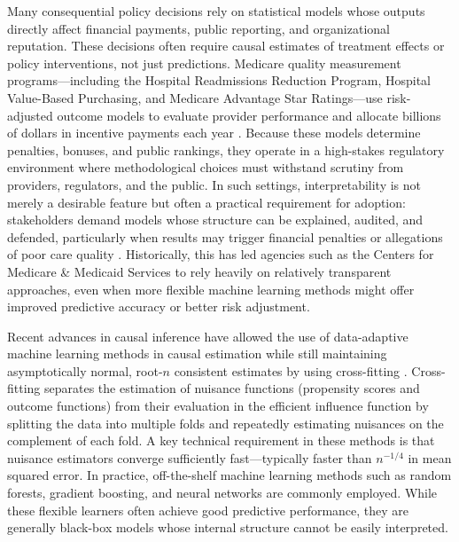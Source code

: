 \documentclass[12pt]{article}
\begin{document}
Many consequential policy decisions rely on statistical models whose outputs directly affect financial payments, public reporting, and organizational reputation. These decisions often require causal estimates of treatment effects or policy interventions, not just predictions. Medicare quality measurement programs---including the Hospital Readmissions Reduction Program, Hospital Value-Based Purchasing, and Medicare Advantage Star Ratings---use risk-adjusted outcome models to evaluate provider performance and allocate billions of dollars in incentive payments each year \citep{cms_quality}. Because these models determine penalties, bonuses, and public rankings, they operate in a high-stakes regulatory environment where methodological choices must withstand scrutiny from providers, regulators, and the public. In such settings, interpretability is not merely a desirable feature but often a practical requirement for adoption: stakeholders demand models whose structure can be explained, audited, and defended, particularly when results may trigger financial penalties or allegations of poor care quality \citep{obermeyer2019, rajkomar2019, rudin2019}. Historically, this has led agencies such as the Centers for Medicare \& Medicaid Services to rely heavily on relatively transparent approaches, even when more flexible machine learning methods might offer improved predictive accuracy or better risk adjustment.

Recent advances in causal inference have allowed the use of data-adaptive machine learning methods in causal estimation while still maintaining asymptotically normal, root-$n$ consistent estimates by using cross-fitting \citep{chernozhukov2018}. Cross-fitting separates the estimation of nuisance functions (propensity scores and outcome functions) from their evaluation in the efficient influence function by splitting the data into multiple folds and repeatedly estimating nuisances on the complement of each fold. A key technical requirement in these methods is that nuisance estimators converge sufficiently fast---typically faster than $n^{-1/4}$ in mean squared error. In practice, off-the-shelf machine learning methods such as random forests, gradient boosting, and neural networks are commonly employed\citep{bach2021, susmann2025}. While these flexible learners often achieve good predictive performance, they are generally black-box models whose internal structure cannot be easily interpreted. 
\end{document}
